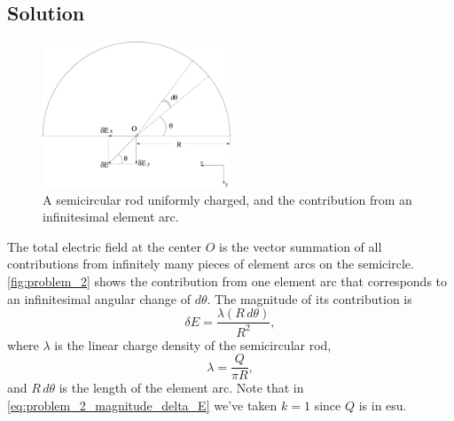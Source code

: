 \documentclass[solutions]{esg8022pset}
\begin{document}
\subsection{Solution}
  \begin{figure}[ht]
    \begin{center}\includegraphics[width=0.5\textwidth]{ps01_sol_02}\end{center}
    \caption{A semicircular rod uniformly charged, and the contribution from an infinitesimal element arc.}
    \label{fig:problem_2}
  \end{figure}

  The total electric field at the center $O$ is the vector summation of all contributions from infinitely many pieces of element arcs on the semicircle.  \autoref{fig:problem_2} shows the contribution from one element arc that corresponds to an infinitesimal angular change of $d\theta$. The magnitude of its contribution is
  \begin{equation}\label{eq:problem_2_magnitude_delta_E}
    \delta E = \frac{\lambda (R\,d\theta)}{R^2},
  \end{equation}
  where $\lambda$ is the linear charge density of the semicircular rod,
  \begin{equation*}\label{eq:problem_2:lambda}
    \lambda = \frac{Q}{\pi R},
  \end{equation*}
  and $R\,d\theta$ is the length of the element arc. Note that in \autoref{eq:problem_2_magnitude_delta_E} we've taken $k = 1$ since $Q$ is in esu.
\end{document}
